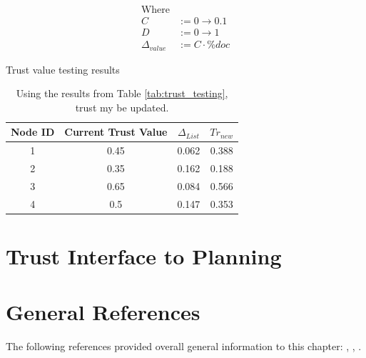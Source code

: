 \begin{table}[h!]
\begin{align*}
    \text{Where}& \\
    C &:= 0 \to 0.1 \\
    D &:= 0 \to 1 \\
    \Delta_{value} &:= C \cdot \%doc
\end{align*}
    \caption{Trust value testing results}
    \label{tab:trust_testing}
\end{table}

\begin{table}[h!]
    \centering
\begin{tabular}{c | c | c | c}
    \hline
    Node ID	& Current Trust Value &	\( \Delta_{List} \) & \( Tr_{new} \)\\
    \hline \hline
1       & 0.45                & 0.062    &    0.388 \\
2       & 0.35                & 0.162    &    0.188 \\
3       & 0.65                & 0.084    &    0.566 \\
4       & 0.5                 & 0.147    &    0.353 \\
\end{tabular}
\caption{Using the results from Table \ref{tab:trust_testing}, trust my be
updated.}
\label{tab:trust_evaulation}
\end{table}
\section{Trust Interface to Planning}
\section{General References}
The following references provided overall general information to this chapter:
\autocite{JiminLi2010}, \autocite{Varadharajan2004},
\autocite{Varadharajan2005}.

